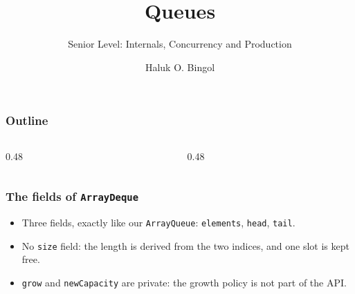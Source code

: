 \documentclass[aspectratio=169,10pt,compress]{beamer}
\title{Queues}
\subtitle{Senior Level: Internals, Concurrency and Production}
\author[Bingol]{Haluk O. Bingol}
\institute[FCIS]{
    Faculty of Computer and Information Sciences\\
    Yeditepe University
}
\date{
	{\tiny \hbTimeStamp}
}
\begin{document}
\begin{frame}[t,fragile]
  \titlepage
\end{frame}




\begin{frame}[t,fragile] \frametitle{Outline}
  \begin{columns}[T]
    \begin{column}{0.48\textwidth}
      \tableofcontents[sections={1-3}, hideallsubsections]
    \end{column}
    \begin{column}{0.48\textwidth}
      \tableofcontents[sections={4-5}, hideallsubsections]
    \end{column}
  \end{columns}
\end{frame}





\begin{frame}[t,fragile] \frametitle{The fields of \texttt{ArrayDeque}}
  \vspace{0.3em}
  \begin{itemize}\small
    \item Three fields, exactly like our \texttt{ArrayQueue}: \texttt{elements}, \texttt{head}, \texttt{tail}.
    \item No \texttt{size} field: the length is derived from the two indices, and one slot is kept free.
    \item \texttt{grow} and \texttt{newCapacity} are private: the growth policy is not part of the API.
  \end{itemize}
\end{frame}
\end{document}
